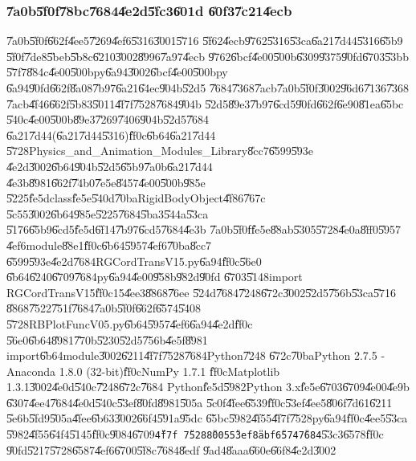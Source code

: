 \subsubsection{\U{7a0b}\U{5f0f}\U{78bc}\U{7684}\U{4e2d}\U{5fc3}\U{601d}%
\U{60f3}\U{7c21}\U{4ecb}}

\U{7a0b}\U{5f0f}\U{662f}\U{4ee5}\U{7269}\U{4ef6}\U{5316}\U{3001}\U{5716}%
\U{5f62}\U{4ecb}\U{9762}\U{5316}\U{53ca}\U{6a21}\U{7d44}\U{5316}\U{65b9}%
\U{5f0f}\U{7de8}\U{5beb}\U{5b8c}\U{6210}\U{3002}\U{8996}\U{7a97}\U{4ecb}%
\U{9762}\U{6bcf}\U{4e00}\U{500b}\U{6309}\U{9375}\U{90fd}\U{6703}\U{53bb}%
\U{57f7}\U{884c}\U{4e00}\U{500b}py\U{6a94}\U{3002}\U{6bcf}\U{4e00}\U{500b}py%
\U{6a94}\U{90fd}\U{662f}\U{8a08}\U{7b97}\U{6a21}\U{64ec}\U{904b}\U{52d5}%
\U{7684}\U{7368}\U{7acb}\U{7a0b}\U{5f0f}\U{3002}\U{96d6}\U{7136}\U{7368}%
\U{7acb}\U{4f46}\U{662f}\U{5b83}\U{5011}\U{4f7f}\U{7528}\U{7684}\U{904b}%
\U{52d5}\U{89e3}\U{7b97}\U{6cd5}\U{90fd}\U{662f}\U{6e90}\U{81ea}\U{65bc}%
\U{540c}\U{4e00}\U{500b}\U{89e3}\U{7269}\U{7406}\U{904b}\U{52d5}\U{7684}%
\U{6a21}\U{7d44}(\U{6a21}\U{7d44}\U{5316})\U{ff0c}\U{6b64}\U{6a21}\U{7d44}%
\U{5728}Physics\_and\_Animation\_Modules\_Library\U{8cc7}\U{6599}\U{593e}%
\U{4e2d}\U{3002}\U{6b64}\U{904b}\U{52d5}\U{65b9}\U{7a0b}\U{6a21}\U{7d44}%
\U{4e3b}\U{8981}\U{662f}\U{74b0}\U{7e5e}\U{8457}\U{4e00}\U{500b}\U{985e}%
\U{5225}\U{fe5d}class\U{fe5e}\U{540d}\U{70ba}RigidBodyObject\U{4f86}\U{767c}%
\U{5c55}\U{3002}\U{6b64}\U{985e}\U{5225}\U{7684}\U{5ba3}\U{544a}\U{53ca}%
\U{5176}\U{65b9}\U{6cd5}\U{fe5d}\U{6f14}\U{7b97}\U{6cd5}\U{7684}\U{4e3b}%
\U{7a0b}\U{5f0f}\U{fe5e}\U{88ab}\U{5305}\U{5728}\U{4e0a}\U{8ff0}\U{5957}%
\U{4ef6}module\U{88e1}\U{ff0c}\U{6b64}\U{5957}\U{4ef6}\U{70ba}\U{8cc7}%
\U{6599}\U{593e}\U{4e2d}\U{7684}RGCordTransV15.py\U{6a94}\U{ff0c}\U{56e0}%
\U{6b64}\U{6240}\U{6709}\U{7684}py\U{6a94}\U{4e00}\U{958b}\U{982d}\U{90fd}%
\U{6703}\U{5148}import RGCordTransV15\U{ff0c}15\U{4ee3}\U{8868}\U{76ee}%
\U{524d}\U{7684}\U{7248}\U{672c}\U{3002}\U{52d5}\U{756b}\U{53ca}\U{5716}%
\U{8868}\U{7522}\U{751f}\U{7684}\U{7a0b}\U{5f0f}\U{662f}\U{6574}\U{5408}%
\U{5728}RBPlotFuncV05.py\U{6b64}\U{5957}\U{4ef6}\U{6a94}\U{4e2d}\U{ff0c}%
\U{56e0}\U{6b64}\U{8981}\U{770b}\U{5230}\U{52d5}\U{756b}\U{4e5f}\U{8981}%
import\U{6b64}module\U{3002}\U{6211}\U{4f7f}\U{7528}\U{7684}Python\U{7248}%
\U{672c}\U{70ba}Python 2.7.5 - Anaconda 1.8.0 (32-bit)\U{ff0c}NumPy 1.7.1%
\U{ff0c}Matplotlib 1.3.1\U{3002}\U{4e0d}\U{540c}\U{7248}\U{672c}\U{7684}%
Python\U{fe5d}\U{5982}Python 3.x\U{fe5e}\U{6703}\U{6709}\U{4e00}\U{4e9b}%
\U{6307}\U{4ee4}\U{7684}\U{4e0d}\U{540c}\U{53ef}\U{80fd}\U{8981}\U{505a}%
\U{5c0f}\U{4fee}\U{6539}\U{ff0c}\U{53ef}\U{4ee5}\U{806f}\U{7d61}\U{6211}%
\U{5e6b}\U{5fd9}\U{505a}\U{4fee}\U{6b63}\U{3002}\U{66f4}\U{591a}\U{95dc}%
\U{65bc}\U{5982}\U{4f55}\U{4f7f}\U{7528}py\U{6a94}\U{ff0c}\U{4ee5}\U{53ca}%
\U{5982}\U{4f55}\U{64f4}\U{5145}\U{ff0c}\U{9084}\U{6709}\texttt{\U{4f7f}%
\U{7528}\U{8005}\U{53ef}\U{8abf}\U{6574}\U{7684}}\U{53c3}\U{6578}\U{ff0c}%
\U{90fd}\U{5217}\U{5728}\U{6587}\U{4ef6}\U{6700}\U{5f8c}\U{7684}\U{8edf}%
\U{9ad4}\U{8aaa}\U{660e}\U{66f8}\U{4e2d}\U{3002}

